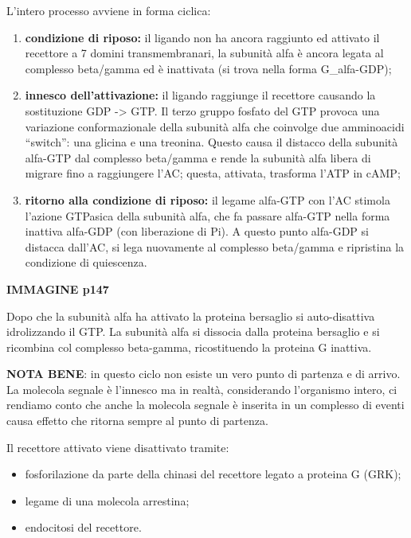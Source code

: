 \documentclass[]{article}
\begin{document}
L'intero processo avviene in forma ciclica:

\begin{enumerate}
\def\labelenumi{\arabic{enumi}.}
\itemsep1pt\parskip0pt
\item
  \textbf{condizione di riposo:} il ligando non ha ancora raggiunto ed
  attivato il recettore a 7 domini transmembranari, la subunità alfa è
  ancora legata al complesso beta/gamma ed è inattivata (si trova nella
  forma G\_alfa-GDP);
\item
  \textbf{innesco dell'attivazione:} il ligando raggiunge il recettore
  causando la sostituzione GDP -\textgreater{} GTP. Il terzo gruppo
  fosfato del GTP provoca una variazione conformazionale della subunità
  alfa che coinvolge due amminoacidi ``switch'': una glicina e una
  treonina. Questo causa il distacco della subunità alfa-GTP dal
  complesso beta/gamma e rende la subunità alfa libera di migrare fino a
  raggiungere l'AC; questa, attivata, trasforma l'ATP in cAMP;
\item
  \textbf{ritorno alla condizione di riposo:} il legame alfa-GTP con
  l'AC stimola l'azione GTPasica della subunità alfa, che fa passare
  alfa-GTP nella forma inattiva alfa-GDP (con liberazione di Pi). A
  questo punto alfa-GDP si distacca dall'AC, si lega nuovamente al
  complesso beta/gamma e ripristina la condizione di quiescenza.
\end{enumerate}

\textbf{IMMAGINE p147}

Dopo che la subunità alfa ha attivato la proteina bersaglio si
auto-disattiva idrolizzando il GTP. La subunità alfa si dissocia dalla
proteina bersaglio e si ricombina col complesso beta-gamma,
ricostituendo la proteina G inattiva.

\textbf{NOTA BENE}: in questo ciclo non esiste un vero punto di partenza
e di arrivo. La molecola segnale è l'innesco ma in realtà, considerando
l'organismo intero, ci rendiamo conto che anche la molecola segnale è
inserita in un complesso di eventi causa effetto che ritorna sempre al
punto di partenza.

Il recettore attivato viene disattivato tramite:

\begin{itemize}
\itemsep1pt\parskip0pt
\item
  fosforilazione da parte della chinasi del recettore legato a proteina
  G (GRK);
\item
  legame di una molecola arrestina;
\item
  endocitosi del recettore.
\end{itemize}
\end{document}
